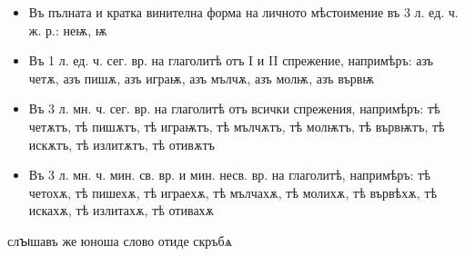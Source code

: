 \documentclass{article}
\begin{document}
	
\begin{itemize}
	\item Въ пълната и кратка винителна форма на личното мѣстоимение въ 3 л. ед. ч. ж. р.: неѭ, ѭ
	
	\item Въ 1 л. ед. ч. сег. вр. на глаголитѣ отъ I и II спрежение, напримѣръ: азъ четѫ, азъ пишѫ, азъ играѭ, азъ мълчѫ, азъ молѭ, азъ вървѭ
	
	\item Въ 3 л. мн. ч. сег. вр. на глаголитѣ отъ всички спрежения, напримѣръ: тѣ четѫтъ, тѣ пишѫтъ, тѣ играѭтъ, тѣ мълчѫтъ, тѣ молѭтъ, тѣ вървѭтъ, тѣ искѫтъ, тѣ излитѫтъ, тѣ отивѫтъ
	
	\item Въ 3 л. мн. ч. мин. св. вр. и мин. несв. вр. на глаголитѣ, напримѣръ: тѣ четохѫ, тѣ пишехѫ, тѣ играехѫ, тѣ мълчахѫ, тѣ молихѫ, тѣ вървѣхѫ, тѣ искахѫ, тѣ излитахѫ, тѣ отивахѫ
\end{itemize}

слꙑшавъ же юноша слово 
отиде скръбѧ  
	
\end{document}
